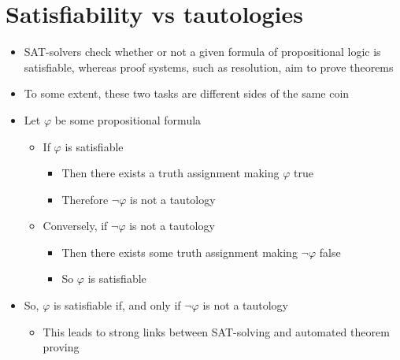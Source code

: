 \documentclass{article}[18pt]
\begin{document}
\section{Satisfiability vs tautologies}
\begin{itemize}
	\item SAT-solvers check whether or not a given formula of propositional logic is satisfiable, whereas proof systems, such as resolution, aim to prove theorems
	\item To some extent, these two tasks are different sides of the same coin
	\item Let $\varphi$ be some propositional formula
	\begin{itemize}
		\item If $\varphi$ is satisfiable
		\begin{itemize}
			\item Then there exists a truth assignment making $\varphi$ true
			\item Therefore $\lnot \varphi$ is not a tautology
		\end{itemize}
		\item Conversely, if $\lnot \varphi$ is not a tautology
		\begin{itemize}
			\item Then there exists some truth assignment making $\lnot\varphi$ false
			\item So $\varphi$ is satisfiable
		\end{itemize}
	\end{itemize}
	\item So, $\varphi$ is satisfiable if, and only if $\lnot \varphi$ is not a tautology
	\begin{itemize}
		\item This leads to strong links between SAT-solving and automated theorem proving
	\end{itemize} 
\end{itemize}
\end{document}
